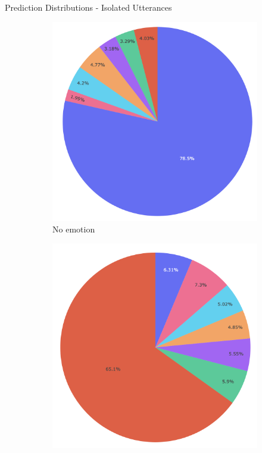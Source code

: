 \documentclass[11pt,aspectratio=169]{beamer}
\begin{document}
    \begin{frame}{Prediction Distributions - Isolated Utterances}
        \begin{figure}[!ht]
        \centering
    \begin{subfigure}{0.18\textwidth}
      \includegraphics[width=\linewidth]{figures/no-emotion.png}
      \caption*{No emotion}
    \end{subfigure}\hfil
    \begin{subfigure}{0.18\textwidth}
      \includegraphics[width=\linewidth]{figures/anger.png}

\end{subfigure}
\end{figure}
\end{frame}
\end{document}
